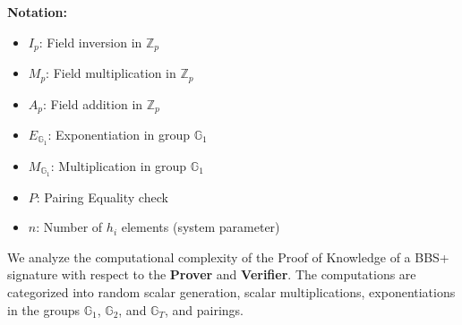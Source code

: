 {\noindent\textbf{Notation:}
\begin{itemize}
\item $I_p$: Field inversion in $\mathbb{Z}_p$
\item $M_p$: Field multiplication in $\mathbb{Z}_p$
\item $A_p$: Field addition in $\mathbb{Z}_p$
\item $E_{\mathbb{G}_1}$: Exponentiation in group $\mathbb{G}_1$
\item $M_{\mathbb{G}_1}$: Multiplication in group $\mathbb{G}_1$
\item $P$: Pairing Equality check
\item $n$: Number of $h_i$ elements (system parameter)
\end{itemize}






























































\newpage
We analyze the computational complexity of the Proof of Knowledge of a BBS+ signature with respect to the \textbf{Prover} and \textbf{Verifier}. The computations are categorized into random scalar generation, scalar multiplications, exponentiations in the groups $\mathbb{G}_1$, $\mathbb{G}_2$, and $\mathbb{G}_T$, and pairings.

}
